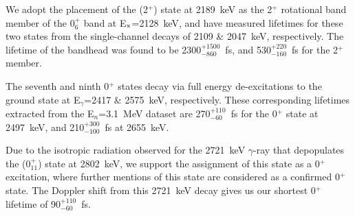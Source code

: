 We adopt the placement \cite{BERZINS1995413} of the (2$^+$) state at 2189~keV as the 2$^+$ rotational band member of the 0$^+_6$ band at E$_{\rm x}$=2128~keV, and have measured lifetimes for these two states from the single-channel decays of 2109 \& 2047~keV, respectively. The lifetime of the bandhead was found to be 2300$^{+1500}_{-860}$~fs, and 530$^{+220}_{-160}$~fs for the 2$^+$ member.

The seventh and ninth 0$^+$ states decay via full energy de-excitations to the ground state at E$_\gamma$=2417 \& 2575~keV, respectively. These corresponding lifetimes extracted from the E$_n$=3.1~MeV dataset are 270$^{+110}_{-60}$~fs for the 0$^+$ state at 2497~keV, and 210$^{+300}_{-100}$~fs at 2655~keV. 

Due to the isotropic radiation observed for the 2721~keV $\gamma$-ray that depopulates the (0$^+_{11}$) state at 2802~keV, we support the assignment of this state as a 0$^+$ excitation, where further mentions of this state are considered as a confirmed 0$^+$ state. The Doppler shift from this 2721~keV decay gives us our shortest 0$^+$ lifetime of 90$^{+110}_{-60}$~fs.

